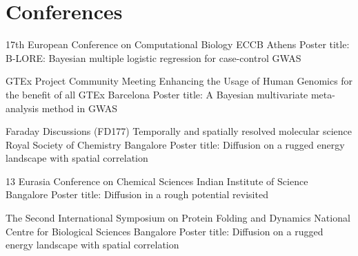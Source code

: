 \section{Conferences}
%
        {17th European Conference on Computational Biology}
        {}
        {ECCB}
        {Athens}
        {Poster title: B-LORE: Bayesian multiple logistic regression for case-control GWAS%
        }

\vspace{0.5em}
%
        {GTEx Project Community Meeting}
        {Enhancing the Usage of Human Genomics for the benefit of all}
        {GTEx}
        {Barcelona}
        {Poster title: A Bayesian multivariate meta-analysis method in GWAS%
        }

\vspace{0.5em}
%
        {Faraday Discussions (FD177)}
        {Temporally and spatially resolved molecular science}
        {Royal Society of Chemistry}
        {Bangalore}
        {Poster title: Diffusion on a rugged energy landscape with spatial correlation%
        }

\vspace{0.5em}
        {13 Eurasia Conference on Chemical Sciences}
        {}
        {Indian Institute of Science}
        {Bangalore}
        {Poster title: Diffusion in a rough potential revisited}

       
\vspace{0.5em}
        {The Second International Symposium on Protein Folding and Dynamics}
        {}
        {National Centre for Biological Sciences}
        {Bangalore}
        {Poster title: Diffusion on a rugged energy landscape with spatial correlation}


